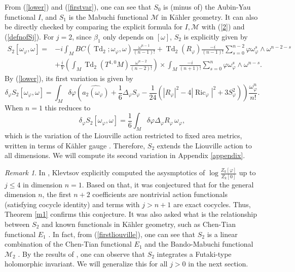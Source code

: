 \documentclass[12pt,reqno,a4paper]{amsart}
\numberwithin{equation}{section}
\def\b{\beta}
\DeclareMathOperator{\Td}{Td}
\DeclareMathOperator{\ric}{Ric}
\theoremstyle{remark}
\newtheorem{remark}{Remark}
\theoremstyle{dotless}
\begin{document}
From (\ref{lower}) and (\ref{firstvar}), one can see that $S_0$ is (minus of) the Aubin-Yau functional $I$, and $S_1$ is the Mabuchi functional $\mathcal{M}$ in K\"ahler geometry. It can also be directly checked by comparing the explicit formula for $I, \mathcal{M}$ \cite{tian2012canonical} with (\ref{2}) and (\ref{defnofSj}). For $j=2$, since $\b_1$ only depends on $[\omega]$, $S_2$ is explicitly given by
\begin{align*}
S_2[\omega_\varphi,\omega]=&-i\int_M BC(\Td_2;\omega_\varphi,\omega)\frac{\omega^{n-1}}{(n-1)!}+\Td_{2}(R_\varphi)\frac{-i}{(n-1)!}\sum^{n-2}_{s=0}\varphi \omega_{\varphi}^s\wedge \omega^{n-2-s}\nonumber\\
&+\frac{i}{V}\left(\int_M \Td_2(T^{1,0}M)\frac{\omega^{n-2}}{(n-2)!}\right)\times\int_M \frac{-i}{(n+1)!}\sum^{n}_{s=0}\varphi \omega_{\varphi}^s\wedge \omega^{n-s}.
\end{align*}
By (\ref{lower}), its first variation is given by
\begin{equation}\label{firstliouville}
\delta_\varphi S_2[\omega_\varphi,\omega]=\int_M \delta\varphi\left(\widehat{a_2(\omega_\varphi)}+\frac{1}{6}\Delta_\varphi S_\varphi-\frac{1}{24}\left(|R_\varphi|^2-4|\ric_\varphi|^2+3S_\varphi^2\right) \right) \frac{\omega_\varphi^n}{n!}.
\end{equation}
When $n=1$ this reduces to
\begin{equation*}
\delta_\varphi S_2[\omega_\varphi,\omega]=\frac16\int_M \delta\varphi\Delta_\varphi R_\varphi \,\omega_\varphi,
\end{equation*}
which is the variation of the Liouville action restricted to fixed area metrics, written in terms of K\"ahler gauge \cite[(5.10)]{klevtsov2014random}. Therefore, $S_2$ extends the Liouville action to all dimensions. We will compute its second variation in Appendix \ref{appendix}.

\begin{remark}\label{klev}
In \cite[(6.6)]{klevtsov2014random}, Klevtsov explicitly computed the asysmptotics of $\log \frac{Z_k[\varphi]}{Z_k[0]}$ up to $j\leq 4$ in dimension $n=1$. Based on that, it was conjectured that for the general dimension $n$, the first $n+2$ coefficients are nontrivial action functionals (satisfying cocycle identity) and terms with $j>n+1$ are exact cocycles. Thus, Theorem \ref{m1} confirms this conjecture. It was also asked what is the relationship between $S_2$ and known functionals in K\"ahler geometry, such as Chen-Tian functional $E_1$ \cite{chen2002ricci}. In fact, from (\ref{firstliouville}), one can see that $S_2$ is a linear combination of the Chen-Tian functional $E_1$ and the Bando-Mabuchi functional $\mathcal{M}_2$ \cite{bando1986some}. By the results of \cite{bando1986some,chen2002ricci}, one can observe that $S_2$ integrates a Futaki-type holomorphic invariant. We will generalize this for all $j>0$ in the next section. 
\end{remark}
\end{document}
